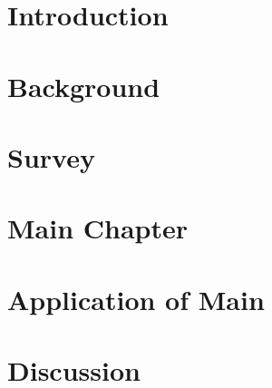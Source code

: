 \documentclass[12pt]{report}
\begin{document}
\beforepreface                      

\newpage






\afterpreface


\chapter{Introduction}
\label{cha:introduction}

      

\chapter{Background}
\label{cha:background}



\chapter{Survey}
\label{cha:lit_survey}



\chapter{Main Chapter}
\label{cha:main_chapter}



\chapter{Application of Main}
\label{cha:application_of_main}



\chapter{Discussion}
\label{cha:discussion}

\end{document}
